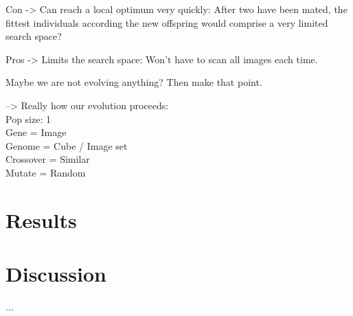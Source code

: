 \documentclass[]{article}
\begin{document}
Con ->  Can reach a local optimum very quickly:  After two have been mated, the fittest individuals according the new offspring would comprise a very limited search space?

Pros ->  Limits the search space:  Won’t have to scan all images each time.

Maybe we are not evolving anything?  Then make that point.

--> Really how our evolution proceeds:\\
Pop size: 1\\
Gene = Image\\
Genome = Cube / Image set\\
Crossover = Similar\\
Mutate = Random




\section{Results}
\label{sec:Results}
\section{Discussion}
\label{sec:Discussion}

...



\end{document}
